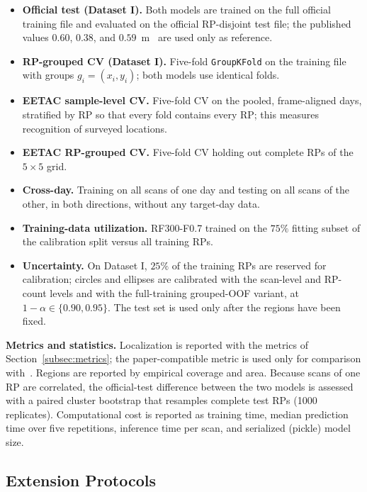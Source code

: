 \begin{itemize}
	\item \textbf{Official test (Dataset I).} Both models are trained on the full official training file and evaluated on the official RP-disjoint test file; the published values $0.60$, $0.38$, and $0.59$~m~\cite{feng2026robust} are used only as reference.
	\item \textbf{RP-grouped CV (Dataset I).} Five-fold \texttt{GroupKFold} on the training file with groups $g_i=(x_i,y_i)$; both models use identical folds.
	\item \textbf{EETAC sample-level CV.} Five-fold CV on the pooled, frame-aligned days, stratified by RP so that every fold contains every RP; this measures recognition of surveyed locations.
	\item \textbf{EETAC RP-grouped CV.} Five-fold CV holding out complete RPs of the $5\times5$ grid.
	\item \textbf{Cross-day.} Training on all scans of one day and testing on all scans of the other, in both directions, without any target-day data.
	\item \textbf{Training-data utilization.} RF300-F0.7 trained on the $75\%$ fitting subset of the calibration split versus all training RPs.
	\item \textbf{Uncertainty.} On Dataset I, $25\%$ of the training RPs are reserved for calibration; circles and ellipses are calibrated with the scan-level and RP-count levels and with the full-training grouped-OOF variant, at $1-\alpha\in\{0.90,0.95\}$. The test set is used only after the regions have been fixed.
\end{itemize}

\textbf{Metrics and statistics.} Localization is reported with the metrics of Section~\ref{subsec:metrics}; the paper-compatible metric is used only for comparison with~\cite{feng2026robust}. Regions are reported by empirical coverage and area. Because scans of one RP are correlated, the official-test difference between the two models is assessed with a paired cluster bootstrap that resamples complete test RPs (1000 replicates). Computational cost is reported as training time, median prediction time over five repetitions, inference time per scan, and serialized (pickle) model size.

\subsection{Extension Protocols}
\label{subsec:extension_protocols}

